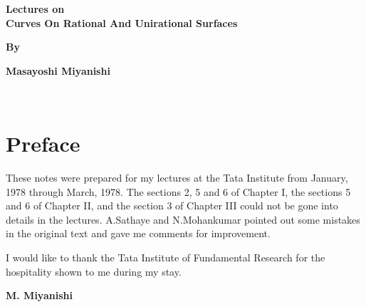 \thispagestyle{empty}
\begin{center}
{\Large\bf Lectures on}\\[5pt]
{\Large\bf Curves On Rational And Unirational Surfaces}
\vskip 1cm


{\bf By}
\bigskip

{\large\bf Masayoshi Miyanishi}
\end{center}

\newpage

~
\thispagestyle{empty}
\chapter*{Preface}


These notes were prepared for my lectures at the Tata Institute from
January, 1978 through March, 1978. The sections 2, 5 and 6 of Chapter
I, the sections 5 and 6 of Chapter II, and the section 3 of Chapter
III could not be gone into details in the lectures. A.\@ Sathaye and
N.\@ Mohankumar pointed out some mistakes in the original text and
gave me comments for improvement.

I would like to thank the Tata Institute of Fundamental Research for
the hospitality shown to me during my stay.
\vskip 1cm

\hfill{\large\bf M. Miyanishi}
